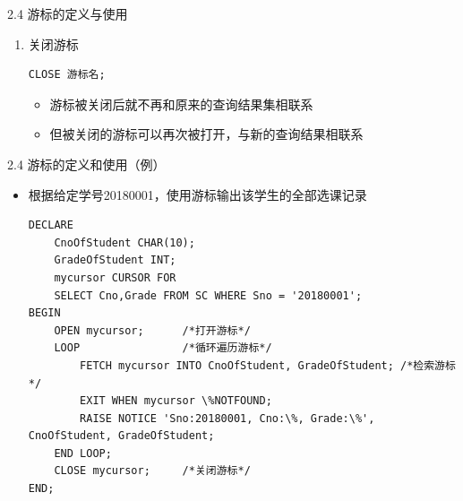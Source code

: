 \begin{frame}{2.4 游标的定义与使用}
\begin{itemize}
\begin{enumerate}
        \framebreak

\item 关闭游标
\begin{block}{}
\begin{lstlisting}
CLOSE 游标名;
\end{lstlisting}
\end{block} 
\begin{itemize}
    \item 游标被关闭后就不再和原来的查询结果集相联系
    \item 但被关闭的游标可以再次被打开，与新的查询结果相联系
\end{itemize}





    \end{enumerate}
\end{itemize}
\end{frame}
 
\begin{frame}[fragile]{2.4 游标的定义和使用（例）}
\begin{itemize}
    \item 根据给定学号20180001，使用游标输出该学生的全部选课记录
\begin{block}{}
\begin{lstlisting}[xleftmargin=0.1\textwidth,linewidth=\linewidth]
DECLARE
    CnoOfStudent CHAR(10);
    GradeOfStudent INT;
    mycursor CURSOR FOR 
    SELECT Cno,Grade FROM SC WHERE Sno = '20180001';
BEGIN
    OPEN mycursor;      /*打开游标*/
    LOOP                /*循环遍历游标*/ 
        FETCH mycursor INTO CnoOfStudent, GradeOfStudent; /*检索游标*/
        EXIT WHEN mycursor \%NOTFOUND;
        RAISE NOTICE 'Sno:20180001, Cno:\%, Grade:\%', CnoOfStudent, GradeOfStudent;
    END LOOP;
    CLOSE mycursor;     /*关闭游标*/
END;
\end{lstlisting}
\end{block} 
\end{itemize}
\end{frame}


